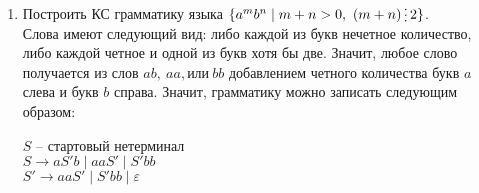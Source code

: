 \documentclass[12pt]{article}
\def\to{\rightarrow}
\def\t{\textrm}
\newcommand{\divby}{\mathop{\raisebox{-2pt}{$\vdots$}}}
\newenvironment{Problems}{
	\begin{enumerate}[]
	}{       
	\end{enumerate}
}
\begin{document}
\begin{Problems}
\begin{center}
			$S \to RS \mid AS_b \mid CR_d \mid AB \mid CD$\\
			$R \to AS_b \mid CR_d \mid AB \mid CD$\\
			$R_d \to RD \mid d$\\
			$S_b \to SB \mid b$\\
			$A \to a$\\
			$B \to b$\\
			$C \to c$\\
			$D \to d$
		\end{center}
		\item [\fbox{3.}] Построить КС грамматику языка $\{a^m b^n \mid m + n > 0,\ (m + n) \divby 2\}$.\\
		Слова имеют следующий вид: либо каждой из букв нечетное количество, либо каждой четное и одной из букв хотя бы две. Значит, любое слово получается из слов $ab,\ aa,\t{или}\ bb$ добавлением четного количества букв $a$ слева и букв $b$ справа. Значит, грамматику можно записать следующим образом: 
		\begin{center}
			$S$ -- стартовый нетерминал\\
			$S \to aS'b \mid aaS' \mid S'bb$\\
			$S' \to aaS' \mid S'bb \mid \varepsilon$\\
		\end{center}		
	\end{Problems}
	
\end{document}
